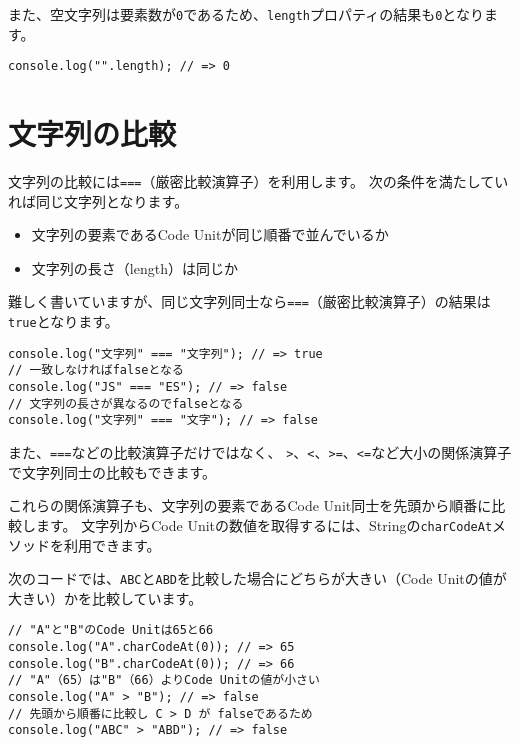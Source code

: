 また、空文字列は要素数が\texttt{0}であるため、\texttt{length}プロパティの結果も\texttt{0}となります。

\begin{lstlisting}
console.log("".length); // => 0
\end{lstlisting}

\hypertarget{compare}{%
\section{文字列の比較}\label{compare}}

文字列の比較には\texttt{===}（厳密比較演算子）を利用します。
次の条件を満たしていれば同じ文字列となります。

\begin{itemize}
\item
  文字列の要素であるCode Unitが同じ順番で並んでいるか
\item
  文字列の長さ（length）は同じか
\end{itemize}

難しく書いていますが、同じ文字列同士なら\texttt{===}（厳密比較演算子）の結果は\texttt{true}となります。

\begin{lstlisting}
console.log("文字列" === "文字列"); // => true
// 一致しなければfalseとなる
console.log("JS" === "ES"); // => false
// 文字列の長さが異なるのでfalseとなる
console.log("文字列" === "文字"); // => false
\end{lstlisting}

また、\texttt{===}などの比較演算子だけではなく、
\texttt{>}、\texttt{<}、\texttt{>=}、\texttt{<=}など大小の関係演算子で文字列同士の比較もできます。

これらの関係演算子も、文字列の要素であるCode
Unit同士を先頭から順番に比較します。 文字列からCode
Unitの数値を取得するには、Stringの\texttt{charCodeAt}メソッドを利用できます。

次のコードでは、\texttt{ABC}と\texttt{ABD}を比較した場合にどちらが大きい（Code
Unitの値が大きい）かを比較しています。

\enlargethispage{\baselineskip}\begin{lstlisting}
// "A"と"B"のCode Unitは65と66
console.log("A".charCodeAt(0)); // => 65
console.log("B".charCodeAt(0)); // => 66
// "A"（65）は"B"（66）よりCode Unitの値が小さい
console.log("A" > "B"); // => false
// 先頭から順番に比較し C > D が falseであるため
console.log("ABC" > "ABD"); // => false
\end{lstlisting}

